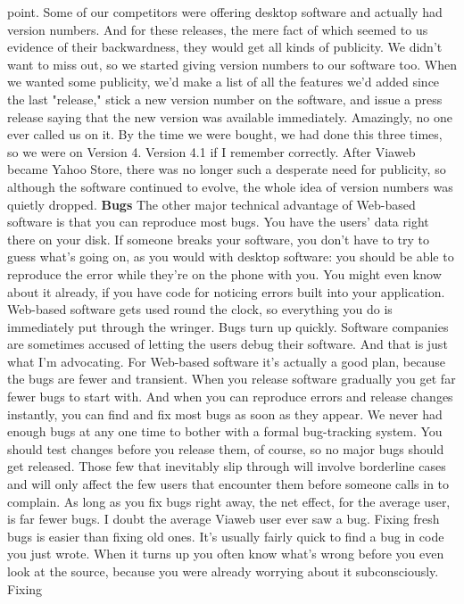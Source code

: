 point.
Some of our competitors were offering desktop software and actually
had version numbers.  And for these releases, the mere fact of
which seemed to us evidence of their backwardness, they would get
all kinds of publicity.  We didn't want to miss out, so we started
giving version numbers to our software too.  When we wanted some
publicity, we'd make a list of all the features we'd added since
the last "release," stick a new version number on the software,
and issue a press release saying that the new version was available
immediately.  Amazingly, no one ever called us on it.
By the time we were bought, we had done this three times, so we
were on Version 4.  Version 4.1 if I remember correctly.  After
Viaweb became Yahoo Store, there was no longer such a desperate
need for publicity, so although the software continued to evolve,
the whole idea of version numbers was quietly dropped.
\textbf{Bugs}
The other major technical advantage of Web-based software is that
you can reproduce most bugs.  You have the users' data right there
on your disk.  If someone breaks your software, you don't have to
try to guess what's going on, as you would with desktop software:
you should be able to reproduce the error while they're on the
phone with you.  You might even know about it already, if you have
code for noticing errors built into your application.
Web-based software gets used round the clock, so everything you do
is immediately put through the wringer.  Bugs turn up quickly.
Software companies are sometimes accused of letting the users debug
their software.  And that is just what I'm advocating.  For Web-based
software it's actually a good plan, because the bugs are fewer and
transient.  When you release software gradually you get far fewer
bugs to start with.  And when you can reproduce errors and release
changes instantly, you can find and fix most bugs as soon as they
appear.  We never had enough bugs at any one time to bother with
a formal bug-tracking system.
You should test changes before you release them, of course, so no
major bugs should get released.  Those few that inevitably slip
through will involve borderline cases and will only affect the few
users that encounter them before someone calls in to complain.  As
long as you fix bugs right away, the net effect, for the average
user, is far fewer bugs.  I doubt the average Viaweb user ever saw
a bug.
Fixing fresh bugs is easier than fixing old ones.  It's usually
fairly quick to find a bug in code you just wrote.  When it turns
up you often know what's wrong before you even look at the source,
because you were already worrying about it subconsciously. Fixing
